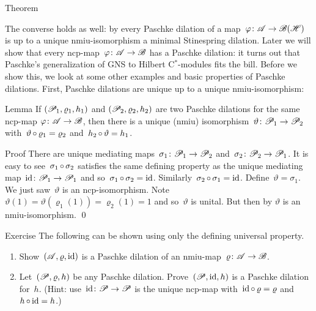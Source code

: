 \documentclass[b]{subfiles}
\begin{document}
\begin{parsec}
\begin{point}{Theorem}
\begin{point}%
The converse holds as well:
    by 
    every Paschke dilation of a map~$\varphi \colon \mathscr{A} \to \mathscr{B}(\mathscr{H})$
    is up to a unique nmiu-isomorphism a minimal Stinespring dilation.
Later we will show that
    every ncp-map~$\varphi\colon \mathscr{A} \to \mathscr{B}$
    has a Paschke dilation:
    it turns out that Paschke's generalization of
    GNS to Hilbert C$^*$-modules fits the bill.
Before we show this,
    we look at some other examples and basic properties
        of Paschke dilations.
First, Paschke dilations are unique up to a unique nmiu-isomorphism:
\par
\end{point}
\end{point}
\begin{point}{Lemma}%
If $(\mathscr{P}_1, \varrho_1, h_1)$
and $(\mathscr{P}_2, \varrho_2, h_2)$
    are two Paschke dilations for 
    the same ncp-map $\varphi\colon \mathscr{A} \to \mathscr{B}$,
    then there is a unique (nmiu)
    isomorphism~$\vartheta \colon \mathscr{P}_1 \to \mathscr{P}_2$
    with~$\vartheta \mathop{\circ} \varrho_1 = \varrho_2$
    and~$h_2 \mathop{\circ} \vartheta = h_1$.
\begin{point}{Proof}%
There are unique mediating maps~$\sigma_1\colon \mathscr{P}_1 \to \mathscr{P}_2$
and~$\sigma_2 \colon \mathscr{P}_2 \to \mathscr{P}_1$.
It is easy to see~$\sigma_1 \mathop{\circ} \sigma_2$
satisfies the same defining property
as the unique mediating map~$\operatorname{id}\colon \mathscr{P}_1 \to \mathscr{P}_1$
and so~$\sigma_1 \mathop{\circ} \sigma_2 = \operatorname{id}$.
Similarly~$\sigma_2 \mathop{\circ} \sigma_1 = \operatorname{id}$.
Define~$\vartheta = \sigma_1$.
We just saw~$\vartheta$ is an ncp-isomorphism.
Note~$\vartheta(1) = \vartheta(\varrho_1(1)) = \varrho_2(1) = 1$
and so~$\vartheta$ is unital.
But then by \TODO{} $\vartheta$ is an nmiu-isomorphism. \qed
\par
\end{point}
\end{point}
\begin{point}{Exercise}%
The following can be shown using only the defining universal property.
\begin{enumerate}
\item
Show~$(\mathscr{A},\varrho,\operatorname{id})$ is a Paschke dilation of
    an nmiu-map~$\varrho\colon \mathscr{A} \to \mathscr{B}$.
\item
Let~$(\mathscr{P}, \varrho, h)$ be any Paschke dilation.
Prove~$(\mathscr{P}, \operatorname{id}, h)$ is a Paschke dilation for~$h$.
(Hint: use~$\operatorname{id}\colon \mathscr{P} \to \mathscr{P}$
is the unique ncp-map with~$\operatorname{id} \mathop{\circ} \varrho = \varrho$
and~$h \mathop{\circ} \operatorname{id} = h$.)

\end{enumerate}
\end{point}
\end{parsec}
\end{document}

